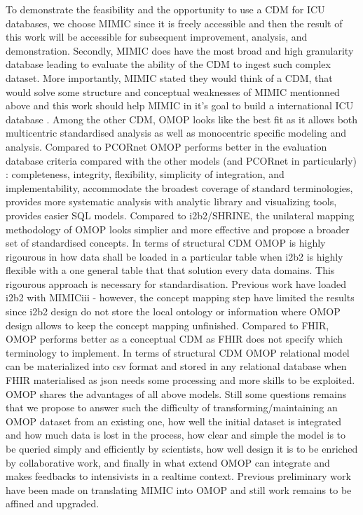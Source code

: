 \documentclass{aes2e}
\begin{document}
To demonstrate the feasibility and the opportunity to use a CDM for ICU
databases, we choose MIMIC since it is freely accessible and then the result of
this work will be accessible for subsequent improvement, analysis, and
demonstration. Secondly, MIMIC does have the most broad and high granularity
database leading to evaluate the ability of the CDM to ingest such complex
dataset. More importantly, MIMIC stated they would think of a
CDM\cite{mimic-nature}, that would solve some structure and conceptual
weaknesses of MIMIC mentionned above and this work should help MIMIC in it's
goal to build a international ICU database \cite{mimic-i2b2}.
Among the other CDM, OMOP looks like the best fit as it allows both
multicentric standardised analysis as well as monocentric specific modeling and
analysis. 
Compared to PCORnet \cite{omop-vs-pcornet} OMOP performs better in the
evaluation database criteria compared with the other models (and PCORnet in
particularly) : completeness, integrity, flexibility, simplicity of
integration, and implementability, accommodate the broadest coverage of
standard terminologies, provides more systematic analysis with analytic library
and visualizing tools, provides easier SQL models.
Compared to i2b2/SHRINE, the unilateral mapping methodology of OMOP looks
simplier and more effective and propose a broader set of standardised concepts.
In terms of structural CDM OMOP is highly rigourous in how data shall be loaded
in a particular table when i2b2 is highly flexible with a one general table
that that solution every data domains. This rigourous approach is necessary for
standardisation. Previous work have loaded i2b2 with MIMICiii \cite{mimic-i2b2}
- however, the concept mapping step have limited the results since i2b2 design
do not store the local ontology or information where OMOP design allows to keep
the concept mapping unfinished.
Compared to FHIR, OMOP performs better as a conceptual CDM as FHIR does not
specify which terminology to implement. In terms of structural CDM OMOP
relational model can be materialized into csv format and stored in any
relational database when FHIR materialised as json needs some processing and
more skills to be exploited.
OMOP shares the advantages of all above models. Still some questions remains
that we propose to answer such the difficulty of transforming/maintaining an
OMOP dataset from an existing one, how well the initial dataset is integrated
and how much data is lost in the process, how clear and simple the model is to
be queried simply and efficiently by scientists, how well design it is to be
enriched by collaborative work, and finally in what extend OMOP can integrate
and makes feedbacks to intensivists in a realtime context. Previous preliminary
work have been made on translating MIMIC into OMOP \cite{mimic-omop-previous}
and still work remains to be affined and upgraded.
\end{document}
